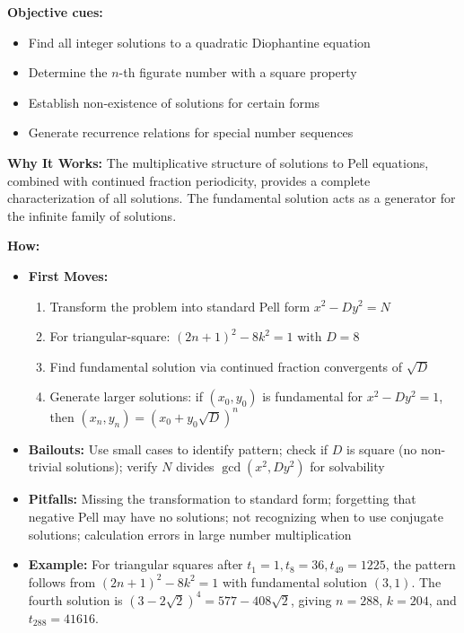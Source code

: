 \documentclass[12pt]{article}
\begin{document}
\textbf{Objective cues:}
\begin{itemize}
    \item Find all integer solutions to a quadratic Diophantine equation
    \item Determine the $n$-th figurate number with a square property
    \item Establish non-existence of solutions for certain forms
    \item Generate recurrence relations for special number sequences
\end{itemize}

\textbf{Why It Works:} The multiplicative structure of solutions to Pell equations, combined with continued fraction periodicity, provides a complete characterization of all solutions. The fundamental solution acts as a generator for the infinite family of solutions.

\textbf{How:}
\begin{itemize}
    \item \textbf{First Moves:} 
    \begin{enumerate}[nosep]
        \item Transform the problem into standard Pell form $x^2 - Dy^2 = N$
        \item For triangular-square: $(2n+1)^2 - 8k^2 = 1$ with $D=8$
        \item Find fundamental solution via continued fraction convergents of $\sqrt{D}$
        \item Generate larger solutions: if $(x_0, y_0)$ is fundamental for $x^2-Dy^2=1$, then $(x_n, y_n) = (x_0 + y_0\sqrt{D})^n$
    \end{enumerate}
    \item \textbf{Bailouts:} Use small cases to identify pattern; check if $D$ is square (no non-trivial solutions); verify $N$ divides $\gcd(x^2, Dy^2)$ for solvability
    \item \textbf{Pitfalls:} Missing the transformation to standard form; forgetting that negative Pell may have no solutions; not recognizing when to use conjugate solutions; calculation errors in large number multiplication
    \item \textbf{Example:} For triangular squares after $t_1=1, t_8=36, t_{49}=1225$, the pattern follows from $(2n+1)^2 - 8k^2 = 1$ with fundamental solution $(3,1)$. The fourth solution is $(3-2\sqrt{2})^4 = 577 - 408\sqrt{2}$, giving $n=288$, $k=204$, and $t_{288} = 41616$.
\end{itemize}
\end{document}
